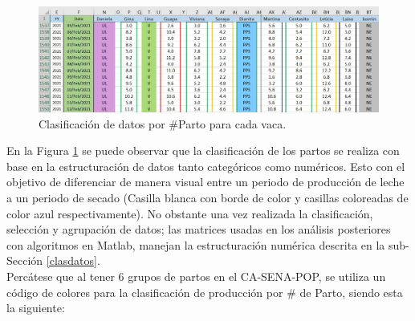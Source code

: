 \begin{figure}[H]
	 \begin{center}
	 \includegraphics[scale=0.45]{img/dfcolorpartos.jpg}
	 \end{center}
	 \caption{Clasificación de datos por \#Parto para cada vaca. \label{colorpartospng}}
\end{figure}

En la Figura \ref{colorpartospng} se puede observar que la clasificación de los partos se realiza con base en la estructuración de datos tanto categóricos como numéricos. Esto con el objetivo de diferenciar de manera visual entre un periodo de producción de leche a un periodo de secado (Casilla blanca con borde de color y casillas coloreadas de color azul respectivamente). No obstante una vez realizada la clasificación, selección y agrupación de datos; las matrices usadas en los análisis posteriores con algoritmos en Matlab, manejan la estructuración numérica descrita en la sub-Sección \ref{clasdatos}.\\

Percátese que al tener 6 grupos de partos en el CA-SENA-POP, se utiliza un código de colores para la clasificación de producción por \# de Parto, siendo esta la siguiente:

